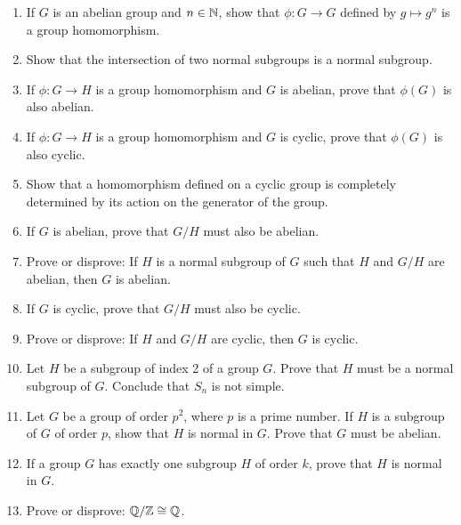{\begin{enumerate}
 
 
 
\bf\item\rm
If $G$ is an abelian group and $n \in {\Bbb N}$, show that $\phi : G
\rightarrow G$  defined by $g \mapsto g^n$ is a group homomorphism. 
 
 
\bf\item\rm
Show that the intersection of two normal subgroups is a normal
subgroup. 
 
 
\bf\item\rm
If $\phi : G \rightarrow H$ is a group homomorphism and $G$ is
abelian, prove that $\phi(G)$ is also abelian. 
 
 
\bf\item\rm
If $\phi : G \rightarrow H$ is a group homomorphism and $G$ is cyclic,
prove that $\phi(G)$ is also cyclic. 
 
 
\bf\item\rm
Show that a homomorphism defined on a cyclic group is completely
determined by its action on the generator of the group.

\bf\item\rm
If $G$ is abelian, prove that $G/H$ must also be abelian.
 
\bf\item\rm
Prove or disprove: If $H$ is a normal subgroup of $G$ such that $H$
and $G/H$ are abelian, then $G$ is abelian. 
 
 

\bf\item\rm
If $G$ is cyclic, prove that $G/H$ must also be cyclic.


\bf\item\rm
Prove or disprove: If $H$ and $G/H$ are cyclic, then $G$ is cyclic.
 
 
\bf\item\rm
Let $H$ be a subgroup of index 2 of a group $G$. Prove that $H$ must
be a normal subgroup of $G$. Conclude that $S_n$ is not simple.
 
 
\bf\item\rm
Let $G$ be a group of order $p^2$, where $p$ is a prime number. If $H$
is a subgroup of $G$ of order $p$, show that $H$ is normal in $G$.
Prove that $G$ must be abelian. 
 
 
\bf\item\rm
If a group $G$ has exactly one subgroup $H$ of order $k$, prove that
$H$ is normal in $G$. 
 
 
\bf\item\rm
Prove or disprove: ${\Bbb Q} / {\Bbb Z} \cong {\Bbb Q}$.
 

\end{enumerate}}
